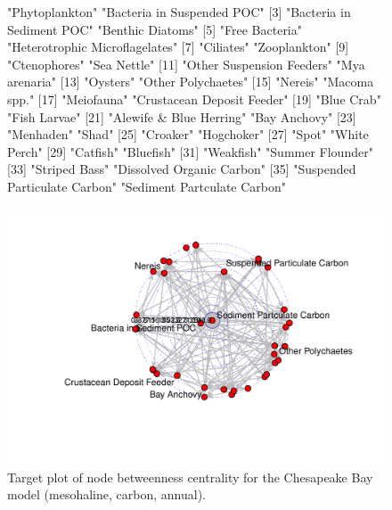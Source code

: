 \documentclass[11pt]{article}
\begin{document}
\begin{figure}[!htbp]
  \center
\begin{Schunk}
\begin{Soutput}
 [1] "Phytoplankton"                 "Bacteria in Suspended POC"    
 [3] "Bacteria in Sediment POC"      "Benthic Diatoms"              
 [5] "Free Bacteria"                 "Heterotrophic Microflagelates"
 [7] "Ciliates"                      "Zooplankton"                  
 [9] "Ctenophores"                   "Sea Nettle"                   
[11] "Other Suspension Feeders"      "Mya arenaria"                 
[13] "Oysters"                       "Other Polychaetes"            
[15] "Nereis"                        "Macoma spp."                  
[17] "Meiofauna"                     "Crustacean Deposit Feeder"    
[19] "Blue Crab"                     "Fish Larvae"                  
[21] "Alewife & Blue Herring"        "Bay Anchovy"                  
[23] "Menhaden"                      "Shad"                         
[25] "Croaker"                       "Hogchoker"                    
[27] "Spot"                          "White Perch"                  
[29] "Catfish"                       "Bluefish"                     
[31] "Weakfish"                      "Summer Flounder"              
[33] "Striped Bass"                  "Dissolved Organic Carbon"     
[35] "Suspended Particulate Carbon"  "Sediment Partculate Carbon"   
\end{Soutput}
\end{Schunk}
\includegraphics{enaR-050}
\caption{Target plot of node betweenness centrality for the Chesapeake
  Bay model (mesohaline, carbon, annual).} \label{fig:target}
\end{figure}
\end{document}
